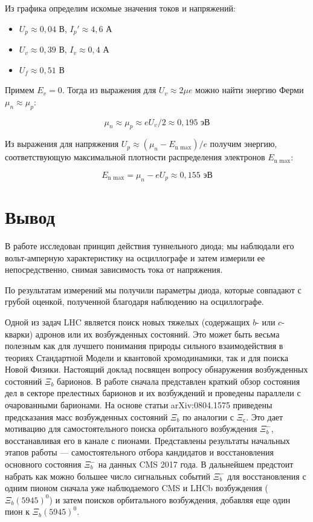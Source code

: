 \documentclass[12pt]{kiarticle} %
\begin{document}
	Из графика определим искомые значения токов и напряжений:
	
	\begin{itemize}
		\item $ U_p \approx 0,04 $ В, $ I_p' \approx 4,6 $ А
		\item $ U_v \approx 0,39 $ В, $ I_v \approx 0,4 $ А
		\item $ U_f \approx 0,51 $ В
	\end{itemize} 

Примем $E_v = 0$. Тогда из выражения для $U_v \approx 2\mu e$ можно найти энергию Ферми $\mu_n \approx \mu_p$:

\[ \mu_n \approx \mu_p \approx eU_v/2 \approx 0,195 \text{ эВ} \]

Из выражения для напряжения $U_p \approx (\mu_n - E_\text{n max})/e$ получим энергию, соответствующую максимальной плотности распределения электронов $E_\text{n max}$:

\[ E_\text{n max} = \mu_n - eU_p \approx 0,155 \text{ эВ} \] 
	
	\section{Вывод} 
	В работе исследован принцип действия туннельного диода; мы наблюдали его вольт-амперную характеристику на осциллографе и затем измерили ее непосредственно, снимая зависимость тока от напряжения. 
	
	По результатам измерений мы получили параметры диода, которые совпадают с грубой оценкой, полученной благодаря наблюдению на осциллографе.
	
	Одной из задач LHC является поиск новых тяжелых (содержащих $ b $- или $ c $- кварки) адронов или их возбужденных состояний. Это может быть весьма полезным как для лучшего понимания природы сильного взаимодействия в теориях Стандартной Модели и квантовой хромодинамики, так и для поиска Новой Физики.
	Настоящий доклад посвящен вопросу обнаружения возбужденных состояний $\Xi_b$ барионов. В работе сначала представлен краткий обзор состояния дел в секторе прелестных барионов и их возбуждений и проведены параллели с очарованными барионами. На основе статьи arXiv:0804.1575 приведены предсказания масс возбужденных состояний $\Xi_b$ по аналогии с $\Xi_с$. Это дает мотивацию для самостоятельного поиска орбитального возбуждения $\Xi_b^-$, восстанавливая его в канале с пионами. 
	Представлены результаты начальных этапов работы --- самостоятельного отбора кандидатов и восстановления основного состояния  $\Xi_b^-$ на данных CMS 2017 года. В дальнейшем предстоит набрать как можно большее число сигнальных событий $\Xi_b^-$ для восстановления с одним пионом сначала уже наблюдаемого CMS и LHCb возбуждения ($\Xi_b(5945)^0$) и затем поисков орбитального возбуждения, добавляя еще один пион к $\Xi_b(5945)^0$.
	
\end{document}
